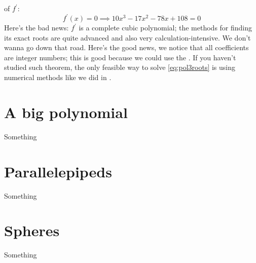 of $f^\prime$:
\begin{equation}\label{eq:pol3roots}
    f^\prime(x) = 0 \implies 10x^3 - 17x^2 - 78x + 108 = 0
\end{equation}
Here's the bad news: $f^\prime$ is a complete cubic polynomial; the methods for finding its exact roots
are quite advanced and also very calculation-intensive. We don't wanna go down that road.
Here's the good news, we notice that all coefficients are integer numbers; this is
good because we could use the
.
If you haven't studied such theorem,
the only feasible way to solve \ref{eq:pol3roots} is using numerical methods like
we did in .

\section{A big polynomial}
\label{sec:bigpoly}
Something

\section{Parallelepipeds}
\label{sec:paralpyd}
Something

\section{Spheres}
\label{sec:speheres}
Something

